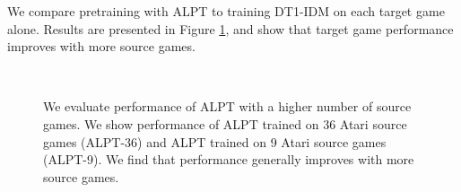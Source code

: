 \documentclass{article} %
\begin{document}
We compare pretraining with ALPT to training DT1-IDM on each target game alone. Results are presented in Figure \ref{alptall}, and show that target game performance improves with more source games.  
\begin{figure}

\centering
{} 
 \\
\centering
{} 
\caption{We evaluate performance of ALPT with a higher number of source games. We show performance of ALPT trained on 36 Atari source games (ALPT-36) and ALPT trained on 9 Atari source games (ALPT-9). We find that performance generally improves with more source games.}
\label{alptall}
\end{figure}
\end{document}
